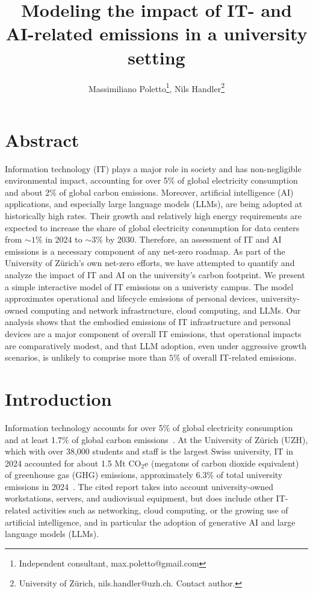\documentclass[11pt]{article}
\title{Modeling the impact of IT- and AI-related emissions in a university setting}
\author{Massimiliano Poletto\thanks{Independent consultant, max.poletto@gmail.com}, Nils Handler\thanks{University of Zürich, nils.handler@uzh.ch. Contact author.}}
\begin{document}
\maketitle

\section{Abstract}
Information technology (IT) plays a major role in society and has non-negligible environmental impact, accounting for over 5\% of global electricity consumption and about 2\% of global carbon emissions. Moreover, artificial intelligence (AI) applications, and especially large language models (LLMs), are being adopted at historically high rates. Their growth and relatively high energy requirements are expected to increase the share of global electricity consumption for data centers from $\sim 1\%$ in 2024 to $\sim 3\%$ by 2030. Therefore, an assessment of IT and AI emissions is a necessary component of any net-zero roadmap. As part of the University of Zürich's own net-zero efforts, we have attempted to quantify and analyze the impact of IT and AI on the university's carbon footprint. We present a simple interactive model of IT emissions on a univeristy campus. The model approximates operational and lifecycle emissions of personal devices, university-owned computing and network infrastructure, cloud computing, and LLMs. Our analysis shows that the embodied emissions of IT infrastructure and personal devices are a major component of overall IT emissions, that operational impacts are comparatively modest, and that LLM adoption, even under aggressive growth scenarios, is unlikely to comprise more than $5\%$ of overall IT-related emissions.

\section{Introduction}

Information technology accounts for over 5\% of global electricity consumption and at least 1.7\% of global carbon emissions~\cite{wb:itu:ict}. At the University of Zürich (UZH), which with over 38,000 students and staff is the largest Swiss university, IT in 2024 accounted for about 1.5 Mt CO$_2$e (megatons of carbon dioxide equivalent) of greenhouse gas (GHG) emissions, approximately 6.3\% of total university emissions in 2024~\cite{uzh:sustainability:report}. The cited report takes into account university-owned workstations, servers, and audiovisual equipment, but does include other IT-related activities such as networking, cloud computing, or the growing use of artificial intelligence, and in particular the adoption of generative AI and large language models (LLMs).
\end{document}
